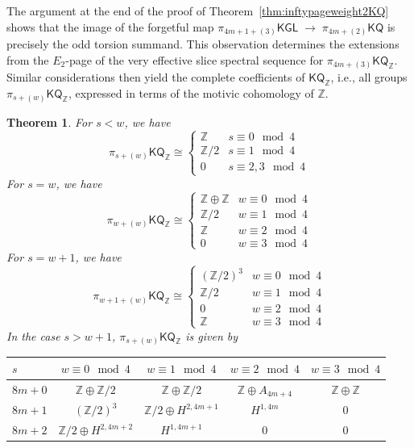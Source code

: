 \documentclass[11pt,hyp,english]{article}
\newcommand{\Z}{\mathbb{Z}}
\newcommand{\KGL}{\mathsf{KGL}}
\newcommand{\KQ}{\mathsf{KQ}}
\newtheorem{theorem}{Theorem}[section]
\theoremstyle{definition}
\begin{document}
The argument at the end of the proof of Theorem~\ref{thm:inftypageweight2KQ} shows that the image of the forgetful map 
$\pi_{4m+1+(3)}\KGL \;\longrightarrow\; \pi_{4m+(2)}\KQ$
is precisely the odd torsion summand. 
This observation determines the extensions from the $E_2$-page of the very effective slice spectral sequence for $\pi_{4m+(3)}\KQ_\Z$. 
Similar considerations then yield the complete coefficients of $\KQ_\Z$, i.e.,  all groups $\pi_{s+(w)}\KQ_\Z$, expressed in terms of the motivic cohomology of $\Z$.


\begin{theorem}\label{thm:coeff-KQZ}
    For $s<w$, we have 
    \[ \pi_{s+(w)}\KQ_\Z\cong 
    \begin{cases} 
        \Z & s\equiv 0 \mod 4 \\ 
        \Z/2 & s\equiv 1 \mod 4 \\
        0 & s\equiv 2,3 \mod 4
    \end{cases}\]
    For $s=w$, we have
    \[ \pi_{w+(w)}\KQ_\Z\cong 
    \begin{cases} 
        \Z\oplus \Z & w\equiv 0 \mod 4 \\ 
        \Z/2 & w\equiv 1 \mod 4 \\
        \Z & w\equiv 2 \mod 4 \\
        0 & w \equiv 3 \mod 4
    \end{cases}\]
     For $s=w+1$, we have
    \[ \pi_{w+1+(w)}\KQ_\Z\cong 
    \begin{cases} 
        (\Z/2)^3 & w\equiv 0 \mod 4 \\ 
        \Z/2 & w\equiv 1 \mod 4 \\
        0 & w\equiv 2 \mod 4 \\
        \Z & w \equiv 3 \mod 4
    \end{cases}\]
    In the case $s>w+1$, $\pi_{s+(w)}\KQ_\Z$ is given by
    \begin{center}
        \begin{tabular}{|l||c|c|c|c|}
        \hline
        $s$ & $w\equiv 0 \mod 4$ & $w\equiv 1 \mod 4$& $w\equiv 2\mod 4$ & $w\equiv 3\mod 4$ \\
        \hline
        \hline
        $8m+0$ & $\Z\oplus \Z/2$ & $\Z\oplus \Z/2$& $\Z \oplus A_{4m+4}$ & $\Z\oplus \Z$ \\
        \hline
        $8m+1$ & $(\Z/2)^3$ & $\Z/2 \oplus H^{2,4m+1}$ & $H^{1,4m}$ & $0$ \\
        \hline
        $8m+2$ & $\Z/2\oplus H^{2,4m+2}$ & $H^{1,4m+1}$ & $0$ & $0$ \\

\end{tabular}
\end{center}
\end{theorem}
\end{document}
